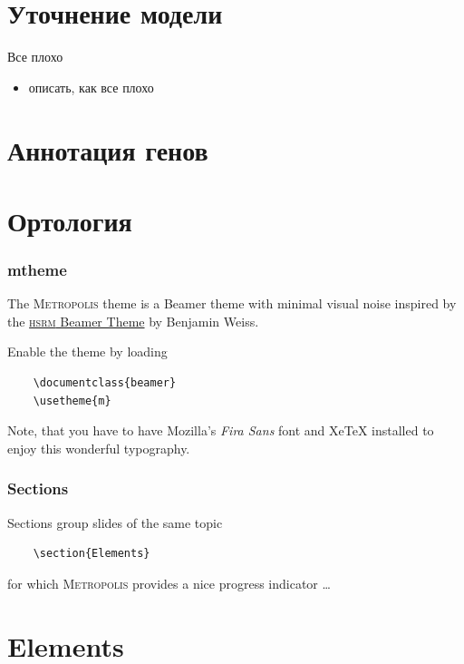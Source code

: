 \documentclass[10pt,pdf,utf8,russian,aspectratio=169]{beamer}
\begin{document}
\section{Уточнение модели}

\begin{frame}{Все плохо}
  \begin{itemize}[<+->]
    \item описать, как все плохо
  \end{itemize}
\end{frame}

\section{Аннотация генов}
\section{Ортология}



\begin{frame}[fragile]
  \frametitle{mtheme}

  The \textsc{Metropolis} theme is a Beamer theme with minimal visual noise
  inspired by the \href{https://github.com/hsrmbeamertheme/hsrmbeamertheme}{\textsc{hsrm} Beamer
  Theme} by Benjamin Weiss.

  Enable the theme by loading

  \begin{verbatim}    \documentclass{beamer}
    \usetheme{m}\end{verbatim}

  Note, that you have to have Mozilla's \emph{Fira Sans} font and XeTeX
  installed to enjoy this wonderful typography.
\end{frame}
\begin{frame}[fragile]
  \frametitle{Sections}
  Sections group slides of the same topic

  \begin{verbatim}    \section{Elements}\end{verbatim}

  for which \textsc{Metropolis} provides a nice progress indicator \ldots
\end{frame}

\section{Elements}
\end{document}
